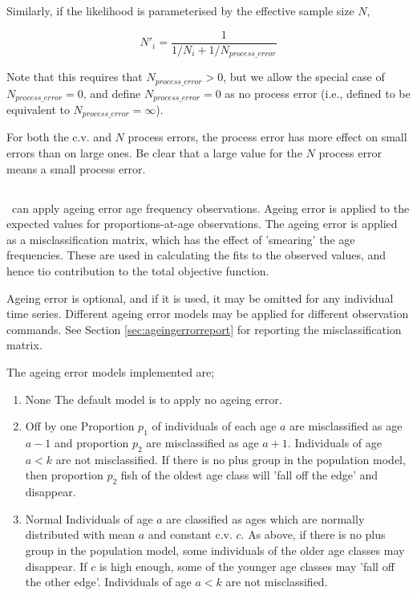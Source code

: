 Similarly, if the likelihood is parameterised by the effective sample size $N$,

\begin{equation}
 N'_i  = \frac{1}{1 / {N_i}+ 1 / N_{process\_error}}
\end{equation}

Note that this requires that $N_{process\_ error} > 0$, but we allow the special case of $N_{process\_ error}=0$, and define $N_{process\_ error}=0$ as no process error (i.e., defined to be equivalent to $N_{process\_ error}=\infty$). 

For both the c.v. and $N$ process errors, the process error has more effect on small errors than on large ones. Be clear that a large value for the $N$ process error means a small process error.

\subsection{}

\SPM\ can apply ageing error age frequency observations. Ageing error is applied to the expected values for proportions-at-age observations. The ageing error is applied as a misclassification matrix, which has the effect of 'smearing' the age frequencies. These are used in calculating the fits to the observed values, and hence tio contribution to the total objective function. 

Ageing error is optional, and if it is used, it may be omitted for any individual time series. Different ageing error models may be applied for different observation commands. See Section \ref{sec:ageingerrorreport} for reporting the misclassification matrix.

The ageing error models implemented are; 
\begin{enumerate}
  \item{None}  The default model is to apply no ageing error.
  \item{Off by one} Proportion $p_1$ of individuals of each age $a$ are misclassified as age $a-1$ and proportion $p_2$ are misclassified as age $a+1$. Individuals of age $a < k$ are not misclassified. If there is no plus group in the population model, then proportion $p_2$ fish of the oldest age class will 'fall off the edge' and disappear. 
  \item{Normal} Individuals of age $a$ are classified as ages which are normally distributed with mean $a$ and constant c.v. $c$. As above, if there is no plus group in the population model, some individuals of the older age classes may disappear. If $c$ is high enough, some of the younger age classes may 'fall off the other edge'. Individuals of age $a < k$ are not misclassified.
\end{enumerate}

